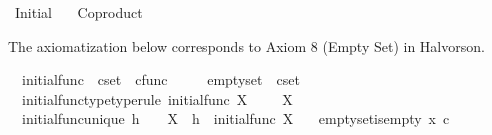 %
\begin{isabellebody}%
%
%
\isadelimdocument
%
\endisadelimdocument
%
\isatagdocument
%
\isamarkuptrue%
%
\endisatagdocument
{\isafolddocument}%
%
\isadelimdocument
%
\endisadelimdocument
%
\isadelimtheory
%
\endisadelimtheory
%
\isatagtheory
{}\isamarkupfalse%
\ Initial\isanewline
\ \ \ Coproduct\isanewline
{}%
\endisatagtheory
{\isafoldtheory}%
%
\isadelimtheory
%
\endisadelimtheory
%
\begin{isamarkuptext}%
The axiomatization below corresponds to Axiom 8 (Empty Set) in Halvorson.%
\end{isamarkuptext}\isamarkuptrue%
\isamarkupfalse%
\isanewline
\ \ initial{\isacharunderscore}{\kern0pt}func\ {\isacharcolon}{\kern0pt}{\isacharcolon}{\kern0pt}\ {\isachardoublequoteopen}cset\ {\isasymRightarrow}\ cfunc{\isachardoublequoteclose}\ {\isacharparenleft}{\kern0pt}{\isachardoublequoteopen}{\isasymalpha}\isactrlbsub {\isacharunderscore}{\kern0pt}\isactrlesub {\isachardoublequoteclose}\ {}{}{}{\isacharparenright}{\kern0pt}\ \isanewline
\ \ emptyset\ {\isacharcolon}{\kern0pt}{\isacharcolon}{\kern0pt}\ {\isachardoublequoteopen}cset{\isachardoublequoteclose}\ {\isacharparenleft}{\kern0pt}{\isachardoublequoteopen}{\isasymemptyset}{\isachardoublequoteclose}{\isacharparenright}{\kern0pt}\isanewline
{}\isanewline
\ \ initial{\isacharunderscore}{\kern0pt}func{\isacharunderscore}{\kern0pt}type{\isacharbrackleft}{\kern0pt}type{\isacharunderscore}{\kern0pt}rule{\isacharbrackright}{\kern0pt}{\isacharcolon}{\kern0pt}\ {\isachardoublequoteopen}initial{\isacharunderscore}{\kern0pt}func\ X\ {\isacharcolon}{\kern0pt}\ \ {\isasymemptyset}\ {\isasymrightarrow}\ X{\isachardoublequoteclose}\ \isanewline
\ \ initial{\isacharunderscore}{\kern0pt}func{\isacharunderscore}{\kern0pt}unique{\isacharcolon}{\kern0pt}\ {\isachardoublequoteopen}h\ {\isacharcolon}{\kern0pt}\ {\isasymemptyset}\ {\isasymrightarrow}\ X\ {\isasymLongrightarrow}\ h\ {\isacharequal}{\kern0pt}\ initial{\isacharunderscore}{\kern0pt}func\ X{\isachardoublequoteclose}\ \isanewline
\ \ emptyset{\isacharunderscore}{\kern0pt}is{\isacharunderscore}{\kern0pt}empty{\isacharcolon}{\kern0pt}\ {\isachardoublequoteopen}{\isasymnot}{\isacharparenleft}{\kern0pt}x\ {\isasymin}\isactrlsub c\ {\isasymemptyset}{\isacharparenright}{\kern0pt}{\isachardoublequoteclose}\isanewline

\end{isabellebody}
